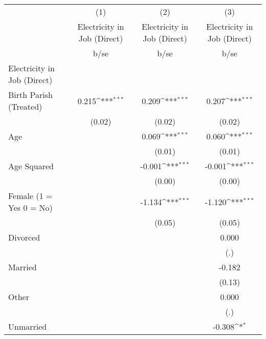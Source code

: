 {
\def\sym#1{\ifmmode^{#1}\else\(^{#1}\)\fi}
\begin{tabular}{l*{3}{c}}
\hline\hline
                    &\multicolumn{1}{c}{(1)}&\multicolumn{1}{c}{(2)}&\multicolumn{1}{c}{(3)}\\
                    &\multicolumn{1}{c}{Electricity in Job (Direct)}&\multicolumn{1}{c}{Electricity in Job (Direct)}&\multicolumn{1}{c}{Electricity in Job (Direct)}\\
                    &        b/se         &        b/se         &        b/se         \\
\hline
Electricity in Job (Direct)&                     &                     &                     \\
Birth Parish (Treated)&       0.215\sym{***}&       0.209\sym{***}&       0.207\sym{***}\\
                    &      (0.02)         &      (0.02)         &      (0.02)         \\
Age                 &                     &       0.069\sym{***}&       0.060\sym{***}\\
                    &                     &      (0.01)         &      (0.01)         \\
Age Squared         &                     &      -0.001\sym{***}&      -0.001\sym{***}\\
                    &                     &      (0.00)         &      (0.00)         \\
Female (1 = Yes 0 = No)&                     &      -1.134\sym{***}&      -1.120\sym{***}\\
                    &                     &      (0.05)         &      (0.05)         \\
Divorced            &                     &                     &       0.000         \\
                    &                     &                     &         (.)         \\
Married             &                     &                     &      -0.182         \\
                    &                     &                     &      (0.13)         \\
Other               &                     &                     &       0.000         \\
                    &                     &                     &         (.)         \\
Unmarried           &                     &                     &      -0.308\sym{*}  \\

\end{tabular}}
